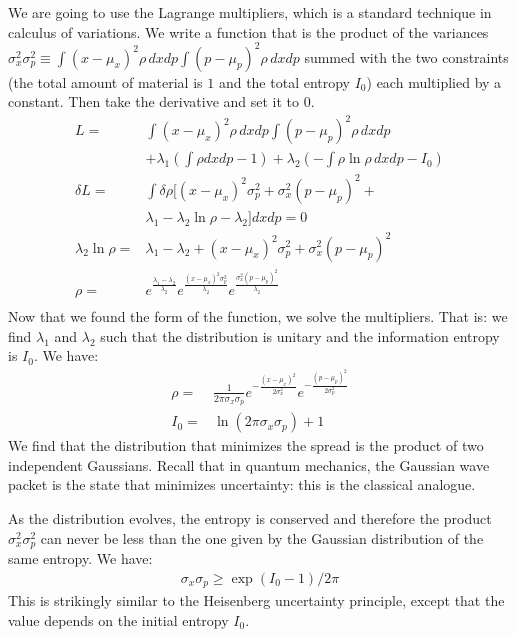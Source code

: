 \documentclass[aps,pra,10pt,floatfix,nofootinbib]{revtex4-1}
\theoremstyle{definition}
\begin{document}
We are going to use the Lagrange multipliers, which is a standard technique in calculus of variations. We write a function that is the product of the variances $\sigma_x^2 \sigma_p^2 \equiv \int (x-\mu_x)^2 \rho \, dxdp \int (p-\mu_p)^2 \rho \, dxdp$ summed with the two constraints (the total amount of material is $1$ and the total entropy $I_0$) each multiplied by a constant. Then take the derivative and set it to $0$.
\begin{align*}
L = &\int (x-\mu_x)^2 \rho \, dxdp \int (p-\mu_p)^2 \rho \, dxdp \\
&+ \lambda_1\left(\int \rho dxdp - 1\right) + \lambda_2\left(- \int \rho \ln \rho \, dxdp - I_0\right)\\
\delta L = &\int \delta \rho [(x-\mu_x)^2 \sigma_p^2 + \sigma_x^2 (p-\mu_p)^2 + \\ &\lambda_1 - \lambda_2 \ln \rho - \lambda_2 ] dxdp = 0 \\
\lambda_2 \ln \rho = &\lambda_1 - \lambda_2 + (x-\mu_x)^2 \sigma_p^2 + \sigma_x^2 (p-\mu_p)^2 \\
\rho = &e^{\frac{\lambda_1 - \lambda_2}{\lambda_2}}e^{\frac{(x-\mu_x)^2 \sigma_p^2}{\lambda_2}}e^{\frac{\sigma_x^2 (p-\mu_p)^2}{\lambda_2}}\\
\end{align*}
Now that we found the form of the function, we solve the multipliers. That is: we find $\lambda_1$ and $\lambda_2$ such that the distribution is unitary and the information entropy is $I_0$. We have:
\begin{align*}
\rho = &\frac{1}{ 2 \pi \sigma_x \sigma_p} e^{-\frac{(x-\mu_x)^2}{2\sigma_x^2}} e^{-\frac{(p-\mu_p)^2}{2\sigma_p^2}} \\
I_0 = &\ln (2\pi\sigma_x\sigma_p) + 1
\end{align*}
We find that the distribution that minimizes the spread is the product of two independent Gaussians. Recall that in quantum mechanics, the Gaussian wave packet is the state that minimizes uncertainty: this is the classical analogue.

As the distribution evolves, the entropy is conserved and therefore the product $\sigma_x^2 \sigma_p^2$ can never be less than the one given by the Gaussian distribution of the same entropy. We have:
\begin{align*}
\sigma_x\sigma_p \geq \exp (I_0 - 1) / 2 \pi 
\end{align*}
This is strikingly similar to the Heisenberg uncertainty principle, except that the value depends on the initial entropy $I_0$.
\end{document}
